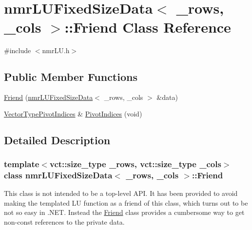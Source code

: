 \hypertarget{classnmr_l_u_fixed_size_data_1_1_friend}{\section{nmr\-L\-U\-Fixed\-Size\-Data$<$ \-\_\-rows, \-\_\-cols $>$\-:\-:Friend Class Reference}
\label{classnmr_l_u_fixed_size_data_1_1_friend}
}


{\ttfamily \#include $<$nmr\-L\-U.\-h$>$}

\subsection*{Public Member Functions}
\begin{DoxyCompactItemize}
\item 
\hyperlink{classnmr_l_u_fixed_size_data_1_1_friend_a9630e8ee3617a9143a11e810a2dd69a4}{Friend} (\hyperlink{classnmr_l_u_fixed_size_data}{nmr\-L\-U\-Fixed\-Size\-Data}$<$ \-\_\-rows, \-\_\-cols $>$ \&data)
\item 
\hyperlink{classnmr_l_u_fixed_size_data_aa44bd56146e161d7b56d7f2001153ccb}{Vector\-Type\-Pivot\-Indices} \& \hyperlink{classnmr_l_u_fixed_size_data_1_1_friend_abccc84b7efae323aaf3ca5bd069787f1}{Pivot\-Indices} (void)
\end{DoxyCompactItemize}


\subsection{Detailed Description}
\subsubsection*{template$<$vct\-::size\-\_\-type \-\_\-rows, vct\-::size\-\_\-type \-\_\-cols$>$class nmr\-L\-U\-Fixed\-Size\-Data$<$ \-\_\-rows, \-\_\-cols $>$\-::\-Friend}

This class is not intended to be a top-\/level A\-P\-I. It has been provided to avoid making the templated L\-U function as a friend of this class, which turns out to be not so easy in .N\-E\-T. Instead the \hyperlink{classnmr_l_u_fixed_size_data_1_1_friend}{Friend} class provides a cumbersome way to get non-\/const references to the private data. 

